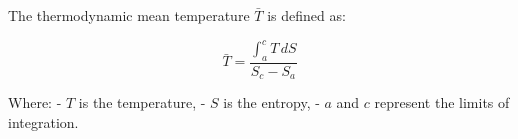 The thermodynamic mean temperature \( \bar{T} \) is defined as:  

\[
\bar{T} = \frac{\int_a^c T \, dS}{S_c - S_a}
\]  

Where:  
- \( T \) is the temperature,  
- \( S \) is the entropy,  
- \( a \) and \( c \) represent the limits of integration.